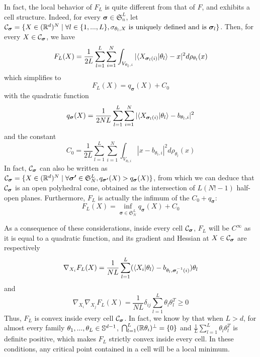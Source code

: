 In fact, the local behavior of $F_L$ is quite different from that of $F$, and exhibits a cell structure. Indeed, for every $\bm{\sigma} \in \mathfrak{S}_n^L$, let $\mathcal C_{\bm{\sigma}} = \{X \in (\mathbb R^d)^N \;|\; \forall l \in \{1,...,L\}, \sigma_{\theta_l,X} \hbox{ is uniquely defined and is } \bm{\sigma}_l \}$. Then, for every $X \in \mathcal C_{\bm{\sigma}}$, we have 
\begin{equation}F_L(X)  = \frac{1}{2L} \sum_{l=1}^L \sum_{i=1}^N \int_{V_{\theta_l,i}} |\langle X_{\bm{\sigma}_l(i)}|\theta_l\rangle - x|^2 d\rho_{\theta_l}(x)\end{equation} 
which simplifies to 
\begin{equation}F_L(X) = q_{\bm{\sigma}}(X) + C_0\end{equation} 
with the quadratic function 
\begin{equation}q_{\bm{\sigma}}(X) = \frac{1}{2NL} \sum_{l=1}^L \sum_{i=1}^N |\langle X_{\bm{\sigma}_l(i)}|\theta_l\rangle - b_{\theta_l,i}|^2\end{equation} 
and the constant 
\begin{equation}C_0 = \frac{1}{2L} \sum_{l=1}^L \sum_{i=1}^N \int_{V_{\theta_l,i}} |x - b_{\theta_l,i}|^2 d\rho_{\theta_l}(x)\end{equation}
In fact, $\mathcal C_{\bm{\sigma}}$ can also be written as $\mathcal C_{\bm{\sigma}} = \{X \in (\mathbb R^d)^N \;|\; \forall \bm{\sigma'} \in \mathfrak{S}_N^L, q_{\bm{\sigma'}}(X) > q_{\bm{\sigma}}(X) \}$, from which we can deduce that $\mathcal C_{\bm{\sigma}}$ is an open polyhedral cone, obtained as the intersection of $L(N!-1)$ half-open planes. Furthermore, $F_L$ is actually the infimum of the $C_0 + q_{\bm{\sigma}}$: 
\begin{equation}F_L(X) = \inf_{\bm{\sigma} \in \mathfrak{S}_N^L} q_{\bm{\sigma}}(X) + C_0\end{equation}

As a consequence of these considerations, inside every cell $\mathcal C_{\bm{\sigma}}$, $F_L$ will be $C^\infty$ as it is equal to a quadratic function, and its gradient and Hessian at $X \in \mathcal C_{\bm{\sigma}}$ are respectively 
\begin{equation} \nabla_{X_i} F_L(X) = \frac{1}{NL} \sum_{l=1}^L (\langle X_i|\theta_l\rangle - b_{\theta_l, \bm{\sigma}^{-1}_l(i)}) \theta_l\end{equation} 
and 
\begin{equation}\nabla_{X_i} \nabla_{X_j} F_L (X) = \frac{1}{NL} \delta_{ij} \sum_{l=1}^L \theta_l \theta_l^T \geq 0\end{equation}
Thus, $F_L$ is convex inside every cell $\mathcal C_{\bm{\sigma}}$. In fact, we know by \citep[Theorem 2]{tanguy2023reconstructing} that when $L > d$, for almost every family $\theta_1,...,\theta_L \in \mathbb S^{d-1}$, $\bigcap_{l=1}^L (\mathbb R\theta_i)^\perp = \{0\}$ and $\frac{1}{L} \sum_{l=1}^L \theta_l \theta_l^T$ is definite positive, which makes $F_L$ strictly convex inside every cell. In these conditions, any critical point contained in a cell will be a local minimum. \\

